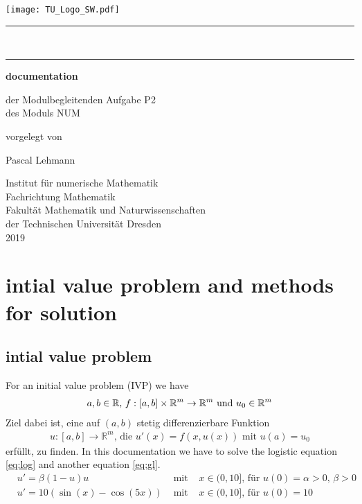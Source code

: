 \documentclass[
paper=A4,fontsize=12pt,
BCOR=15mm,DIV=22,
headinclude=true,footinclude=false,
parskip=full,
numbers=noendperiod,
ngerman,fleqn,             %
bibliography=totoc, %
toc=listof, %
cleardoublepage=empty,      %
version = last
]{scrartcl}
\newcommand{\R}{\mathbb{R}}
\begin{document}

\begin{titlepage}
	{
		\flushleft\texttt{[image: TU\_Logo\_SW.pdf]}\\[-2mm]
		\rule{\textwidth}{0.5pt}\\[-3.7mm]
		\rule{\textwidth}{0.5pt}
	}
	
	\centering\large
	{\huge\bfseries documentation}
	
	{der Modulbegleitenden Aufgabe P2\\
		des Moduls NUM
	}
	
	vorgelegt von
	
	{\Large Pascal Lehmann}
	
	Institut für numerische Mathematik\\
	Fachrichtung Mathematik\\
	Fakultät Mathematik und Naturwissenschaften\\
	der Technischen Universität Dresden\\
	2019
\end{titlepage}


\setcounter{page}{1}

\tableofcontents
\clearpage

\setcounter{page}{1}

\section{intial value problem and methods for solution}
\subsection{intial value problem}
For an initial value problem (IVP) we have
\begin{align}
\notag 
a,b\in \R\text{, } f:[a,b]\times\R^m\to\R^m \text{ und } u_0\in\R^m
\end{align}
Ziel dabei ist, eine auf $(a,b)$ stetig differenzierbare Funktion 
\begin{align}
\label{eq:AWP}
u:[a,b]\to\R^m \text{, die } u'(x)=f(x,u(x)) \text{ mit } u(a)=u_0
\end{align}
erfüllt, zu finden.
In this documentation we have to solve the logistic equation \eqref{eq:log} and another equation \eqref{eq:gl}.
\begin{align}
\label{eq:log}
& u'=\beta (1-u)u & \text{ mit } & x\in (0,10] \text{, für }u(0)=\alpha > 0 \text{, } \beta > 0 \\
\label{eq:gl}
&u'=10(\sin(x)-\cos(5x))& \text{ mit }& x\in (0,10] \text{, für } u(0)= 10 
\end{align}
\end{document}
